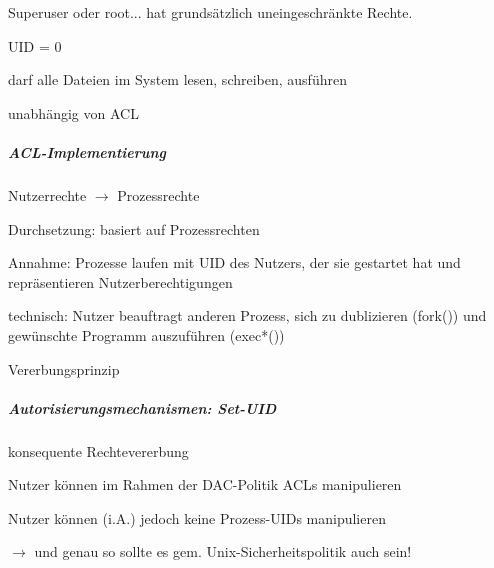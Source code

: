 \documentclass[a4paper]{article}
\begin{document}
\begin{multicols}{3}
    Superuser oder root... hat grundsätzlich uneingeschränkte Rechte.
    \begin{itemize*}
        \item UID = 0
        \item darf alle Dateien im System lesen, schreiben, ausführen
        \item unabhängig von ACL
    \end{itemize*}

    \subparagraph{ACL-Implementierung}
    Nutzerrechte $\rightarrow$ Prozessrechte

    Durchsetzung: basiert auf Prozessrechten
    \begin{itemize*}
        \item Annahme: Prozesse laufen mit UID des Nutzers, der sie gestartet hat und repräsentieren Nutzerberechtigungen
        \item technisch: Nutzer beauftragt anderen Prozess, sich zu dublizieren (fork()) und gewünschte Programm auszuführen (exec*())
        \item Vererbungsprinzip %
    \end{itemize*}

    \subparagraph{Autorisierungsmechanismen: Set-UID}

    konsequente Rechtevererbung
    \begin{itemize*}
        \item Nutzer können im Rahmen der DAC-Politik ACLs manipulieren
        \item Nutzer können (i.A.) jedoch keine Prozess-UIDs manipulieren
        \item $\rightarrow$ und genau so sollte es gem. Unix-Sicherheitspolitik auch sein!
    \end{itemize*}


\end{multicols}
\end{document}
